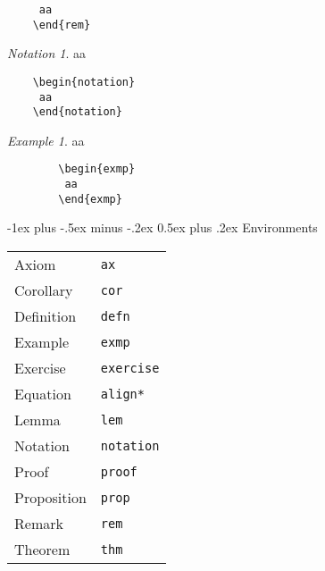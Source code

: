 \documentclass[a4paper,10pt,landscape]{article}
\makeatletter
\renewcommand{\section}{\@startsection{section}{1}{0mm}%
	                                {-1ex plus -.5ex minus -.2ex}%
	                                {0.5ex plus .2ex}%
	                                {\normalfont\large\bfseries}}
\theoremstyle{definition}
\theoremstyle{remark}
\newtheorem*{notation}{Notation}
\newtheorem{exmp}{Example}[section] %
\makeatother
\begin{document}
\begin{multicols}{3}
\begin{multicols}{2}
\begin{verbatim}
	 aa
	\end{rem}
	\end{verbatim}
\end{multicols}
\begin{multicols}{2}
	\begin{notation}
		aa
	\end{notation}
\columnbreak
	\begin{verbatim}
	\begin{notation}
	 aa
	\end{notation}
	\end{verbatim}
\end{multicols}
\begin{multicols}{2}
	\begin{exmp}
		aa
	\end{exmp}
\columnbreak
	\begin{verbatim}
		\begin{exmp}
		 aa
		\end{exmp}
	\end{verbatim}
\end{multicols}




\section{Environments}

\begin{tabular}{@{}ll@{}}
	Axiom	&\verb!ax!\\
	Corollary	&\verb!cor!\\
	Definition	&\verb!defn!\\
	Example	&\verb!exmp!\\
	Exercise	&\verb!exercise!\\
	Equation	&\verb!align*!\\
	Lemma	&\verb!lem!\\
	Notation	&\verb!notation!\\
	Proof	&\verb!proof!\\
	Proposition	&\verb!prop!\\
	Remark	&\verb!rem!\\
	Theorem	&\verb!thm!\\
\end{tabular}





\end{multicols}
\end{document}
